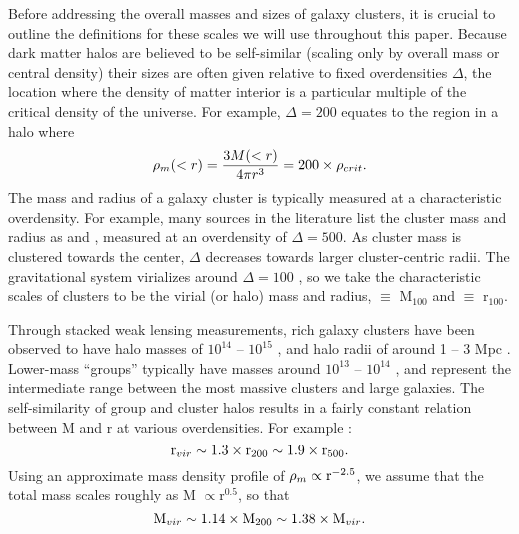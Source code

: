 Before addressing the overall masses and sizes of galaxy clusters, it
is crucial to outline the definitions for these scales we will use
throughout this paper. Because dark matter halos are believed to be
self-similar (scaling only by overall mass or central density) their
sizes are often given relative to fixed overdensities $\Delta$, the
location where the density of matter interior is a particular multiple of
the critical density of the universe. For example, $\Delta = 200$
equates to the region in a halo where
\begin{equation}
\rho_m(<r) = \frac{3M(<r)}{4\pi{}r^3} = 200\times\rho_{crit}. \nonumber
\end{equation}
The mass and radius of a galaxy cluster is typically measured at a
characteristic overdensity. For example, many sources in the
literature list the cluster mass and radius as \Mfive{} and
\rfive{}, measured at an overdensity of $\Delta = 500$. As cluster
mass is clustered towards the center, $\Delta$ decreases towards
larger cluster-centric radii. The gravitational system virializes
around $\Delta = 100$ \citep{Eke1996}, so we take the characteristic
scales of clusters to be the virial (or halo) mass and radius,
\Mvir{} $ \equiv $ M$_{100}$ and \rvir{} $ \equiv $ r$_{100}$.

Through stacked weak lensing measurements, rich galaxy clusters have
been observed to have halo masses of $10^{14}$ -- $10^{15}$ \Msun{}
\citep{Mandelbaum2008}, and halo radii of around 1 -- 3 Mpc
\citep{Vikhlinin2006}. Lower-mass ``groups'' typically have masses
around $10^{13}$ -- $10^{14}$ \Msun{}, and represent the
intermediate range between the most massive clusters and large
galaxies. The self-similarity of group and cluster halos results in a
fairly constant relation between M and r at various overdensities. For
example \citep{Rasheed2011}:
\begin{equation}
\textrm{r\ensuremath{_{vir}}}{} \sim 1.3\times{}\textrm{r\ensuremath{_{200}}}{} \sim
1.9\times{}\textrm{r\ensuremath{_{500}}}{}.
\end{equation}
Using an approximate mass density profile of $\rho_m \propto
\textrm{r}^{-2.5}$, we assume that the total mass scales roughly as
M $\propto \textrm{r}^{0.5}$, so that
\begin{equation}
\textrm{M\ensuremath{_{vir}}}{} \sim 1.14\times{}\textrm{M\ensuremath{_{200}}}{} \sim 1.38 \times{}\textrm{M\ensuremath{_{vir}}}{}.
\end{equation}

